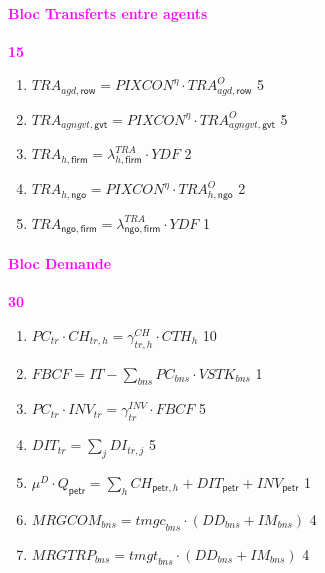 \documentclass[11pt,a4paper]{article}
\newcommand{\agngvt}{\mathit{agngvt}}
\newcommand{\agd}{\mathit{agd}}
\newcommand{\gvt}{\mathsf{gvt}}
\newcommand{\firm}{\mathsf{firm}}
\newcommand{\ngo}{\mathsf{ngo}}
\newcommand{\row}{\mathsf{row}}
\newcommand{\YDF}{\mathit{YDF}}
\newcommand{\bns}{\mathit{bns}}
\newcommand{\CH}{\mathit{CH}}
\newcommand{\CTH}{\mathit{CTH}}
\newcommand{\DD}{\mathit{DD}}
\newcommand{\DI}{\mathit{DI}}
\newcommand{\DIT}{\mathit{DIT}}
\newcommand{\FBCF}{\mathit{FBCF}}
\newcommand{\IM}{\mathit{IM}}
\newcommand{\INV}{\mathit{INV}}
\newcommand{\IT}{\mathit{IT}}
\newcommand{\MRGTRP}{\mathit{MRGTRP}}
\newcommand{\MRGCOM}{\mathit{MRGCOM}}
\newcommand{\PC}{\mathit{PC}}
\newcommand{\PIXCON}{\mathit{PIXCON}}
\newcommand{\TR}{\mathit{TRA}}
\newcommand{\petr}{\mathsf{petr}}
\newcommand{\tr}{\mathit{tr}}
\newcommand{\tmgc}{\mathit{tmgc}}
\newcommand{\tmgt}{\mathit{tmgt}}
\newcommand{\VSTK}{\mathit{VSTK}}
\newcommand{\redparagraph}[1]{\paragraph*{\large\textcolor{Fuchsia}{#1}}}
\begin{document}
	\redparagraph{Bloc Transferts entre agents}\hfill \textcolor{Fuchsia}{\textbf{15}}
	\begin{enumerate}[itemsep=2pt,label=\textbf{eq\arabic*}.,resume,  ref=\textbf{eq\arabic*}]
		
		\item $\TR_{\agd,\row} = \PIXCON^\eta\cdot\TR_{\agd,\row}^{O}$ \hfill 5
		
		\item $\TR_{\agngvt,\gvt} = \PIXCON^\eta\cdot\TR_{\agngvt,\gvt}^{O}$ \hfill 5
		
		
		\item $\TR_{h,\firm} = \lambda^{\TR}_{h,\firm} \cdot\YDF$ \hfill 2		
		
		\item $\TR_{h,\ngo} = \PIXCON^\eta\cdot\TR_{h,\ngo}^{O}$ \hfill 2
		
		\item $\TR_{\ngo,\firm} = \lambda^{\TR}_{\ngo,\firm} \cdot\YDF$  \hfill 1
		
	\end{enumerate}
	
	\redparagraph{Bloc Demande}\hfill \textcolor{Fuchsia}{\textbf{30}}
	\begin{enumerate}[itemsep=2pt,label=\textbf{eq\arabic*}.,resume,ref=\textbf{eq\arabic*}]
		
		\item $\PC_{tr}\cdot\CH_{\tr,h}  = \gamma^{\CH}_{\tr,h} \cdot \CTH_h$   \label{it:CHtrh} \hfill  10
		
		\item $\FBCF = \IT - \sum_{\bns}\PC_{\bns}\cdot\VSTK_{\bns}$ \hfill 1
		
		\item $\PC_{tr}\cdot\INV_{\tr}   = \gamma^{\INV}_{\tr} \cdot \FBCF$   \label{it:INV} \hfill 5 
		
		\item $\DIT_{\tr} = \sum_{j} \DI_{\tr,j}$ \hfill 5
		
		\item $\mu^{D}\cdot Q_{\petr} = \sum_{h} \CH_{\petr,h} + \DIT_{\petr}  + \INV_{\petr}$  \label{it:muDQ}\hfill 1
		
		\item $\MRGCOM_{\bns} = \tmgc_{\bns} \cdot \left(\DD_{\bns} + \IM_{\bns}\right)$ \label{it:MGCOM}  \hfill 4
		
		\item $\MRGTRP_{\bns} = \tmgt_{\bns} \cdot \left( \DD_{\bns} + \IM_{\bns}\right)$  \label{it:MGTRP} \hfill 4
		
	\end{enumerate}
	
\end{document}
